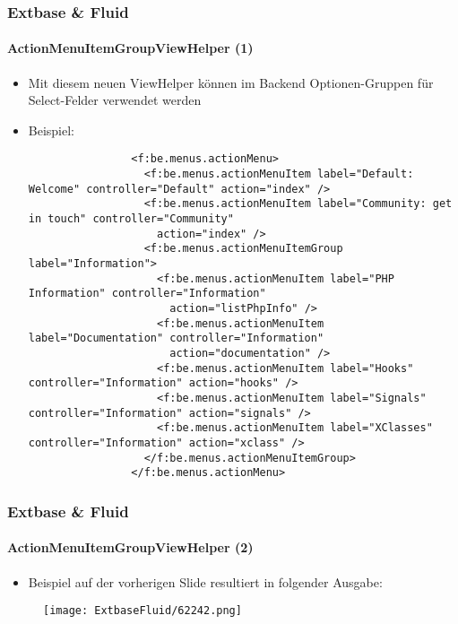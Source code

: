 \begin{frame}[fragile]
	\frametitle{Extbase \& Fluid}
	\framesubtitle{ActionMenuItemGroupViewHelper (1)}

	\lstset{basicstyle=\tiny\ttfamily}

	\begin{itemize}

		\item Mit diesem neuen ViewHelper können im Backend Optionen-Gruppen für Select-Felder verwendet werden

		\item Beispiel:
			\begin{lstlisting}
				<f:be.menus.actionMenu>
				  <f:be.menus.actionMenuItem label="Default: Welcome" controller="Default" action="index" />
				  <f:be.menus.actionMenuItem label="Community: get in touch" controller="Community"
				    action="index" />
				  <f:be.menus.actionMenuItemGroup label="Information">
				    <f:be.menus.actionMenuItem label="PHP Information" controller="Information"
				      action="listPhpInfo" />
				    <f:be.menus.actionMenuItem label="Documentation" controller="Information"
				      action="documentation" />
				    <f:be.menus.actionMenuItem label="Hooks" controller="Information" action="hooks" />
				    <f:be.menus.actionMenuItem label="Signals" controller="Information" action="signals" />
				    <f:be.menus.actionMenuItem label="XClasses" controller="Information" action="xclass" />
				  </f:be.menus.actionMenuItemGroup>
				</f:be.menus.actionMenu>
			\end{lstlisting}

	\end{itemize}

\end{frame}


\begin{frame}[fragile]
	\frametitle{Extbase \& Fluid}
	\framesubtitle{ActionMenuItemGroupViewHelper (2)}

	\begin{itemize}
		\item Beispiel auf der vorherigen Slide resultiert in folgender Ausgabe:
	\end{itemize}

	\begin{figure}
		\texttt{[image: ExtbaseFluid/62242.png]}
	\end{figure}

\end{frame}

